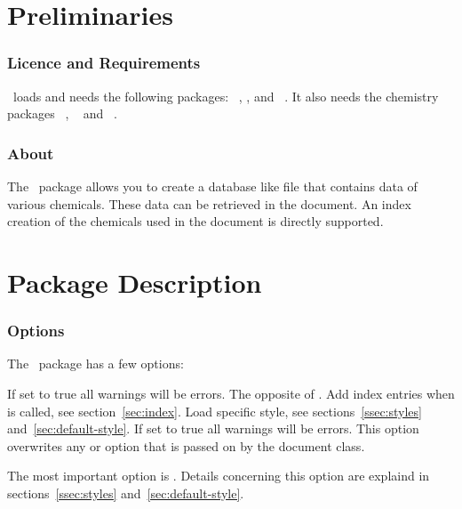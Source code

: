 \documentclass[load-preamble+]{cnltx-doc}
\begin{document}
\part{Preliminaries}

\section{Licence and Requirements}
\license

\substances\ loads and needs the following packages:
~\cite{bnd:l3kernel}, ,  and
~\cite{bnd:l3packages}. It also needs the chemistry packages
~\cite{pkg:chemmacros}, ~\cite{pkg:chemfig} and
~\cite{pkg:ghsystem}.

\section{About}
The \substances\ package allows you to create a database like file that contains
data of various chemicals. These data can be retrieved in the document. An index
creation of the chemicals used in the document is directly supported.

\part{Package Description}

\section{Options}\label{sec:options}
The \substances\ package has a few options:
\begin{options}
    If set to true all warnings will be errors.
    The opposite of .
    Add index entries when  is called, see section~\ref{sec:index}.
    Load specific style, see sections~\ref{ssec:styles}
    and~\ref{sec:default-style}.
    If set to true all warnings will be errors. This option overwrites any
     or  option that is passed on by the document
    class.
\end{options}

The most important option is .  Details concerning this option
are explaind in sections~\ref{ssec:styles} and~\ref{sec:default-style}.
\end{document}
